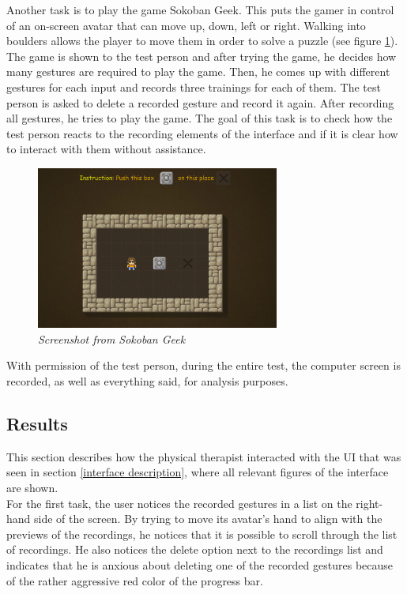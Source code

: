 Another task is to play the game Sokoban Geek. This puts the gamer in control of an on-screen avatar that can move up, down, left or right. Walking into boulders allows the player to move them in order to solve a puzzle (see figure \ref{fig: sokoban_geek}). The game is shown to the test person and after trying the game, he decides how many gestures are required to play the game. Then, he comes up with different gestures for each input and records three trainings for each of them. The test person is asked to delete a recorded gesture and record it again. After recording all gestures, he tries to play the game. The goal of this task is to check how the test person reacts to the recording elements of the interface and if it is clear how to interact with them without assistance.\\

\begin{figure}[H]
\begin{center}
\includegraphics[width=8cm]{SokobanGeek.png}
\caption{\emph{Screenshot from Sokoban Geek}}
\label{fig: sokoban_geek}
\end{center}
\end{figure}

\newpage

With permission of the test person, during the entire test, the computer screen is recorded, as well as everything said, for analysis purposes.


\subsection{Results}

This section describes how the physical therapist interacted with the UI that was seen in section \ref{interface description}, where all relevant figures of the interface are shown.\\

For the first task, the user notices the recorded gestures in a list on the right-hand side of the screen. By trying to move its avatar's hand to align with the previews of the recordings, he notices that it is possible to scroll through the list of recordings. He also notices the delete option next to the recordings list and indicates that he is anxious about deleting one of the recorded gestures because of the rather aggressive red color of the progress bar.\\

